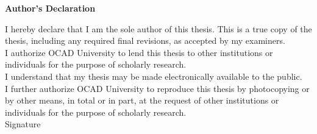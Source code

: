 \begin{center}
\large\textbf{Author's Declaration}
\end{center}

\normalsize
\noindent
I hereby declare that I am the sole author of this thesis. This is a true copy of the thesis, including any required final revisions, as accepted by my examiners.
\\[0.5cm]
I authorize OCAD University to lend this thesis to other institutions or individuals for the purpose of scholarly research.
\\[0.5cm]
I understand that my thesis may be made electronically available to the public.
\\[0.5cm]
I further authorize OCAD University to reproduce this thesis by photocopying or by other means, in total or in part, at the request of other institutions or individuals for the purpose of scholarly research.
\\[1cm]
Signature \hspace{0.5cm} \makebox[7.5cm]{\hrulefill}		%